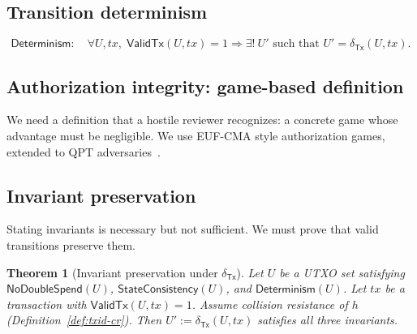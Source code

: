 \documentclass[11pt]{article}
\newtheorem{theorem}{Theorem}
\newcommand{\Tx}{\mathsf{Tx}}
\newcommand{\ValidTx}{\mathsf{ValidTx}}
\newcommand{\DeltaTx}{\delta_{\Tx}}
\begin{document}
\subsection{Transition determinism}
\[
\textsf{Determinism}:\quad
\forall U,tx,\; \ValidTx(U,tx)=1 \Rightarrow \exists!\ U' \text{ such that } U'=\DeltaTx(U,tx).
\]

\subsection{Authorization integrity: game-based definition}

We need a definition that a hostile reviewer recognizes: a concrete game whose advantage must be negligible.
We use EUF-CMA style authorization games, extended to QPT adversaries~\cite{gmr1988,boneh2013quantum}.

\subsection{Invariant preservation}\label{sec:invariant-preservation}

Stating invariants is necessary but not sufficient.
We must prove that valid transitions preserve them.

\begin{theorem}[Invariant preservation under $\DeltaTx$]\label{thm:inv-preservation}
Let $U$ be a UTXO set satisfying $\textsf{NoDoubleSpend}(U)$, $\textsf{StateConsistency}(U)$, and $\textsf{Determinism}(U)$.
Let $tx$ be a transaction with $\ValidTx(U,tx)=1$.
Assume collision resistance of $h$ (Definition~\ref{def:txid-cr}).
Then $U':=\DeltaTx(U,tx)$ satisfies all three invariants.
\end{theorem}
\end{document}
